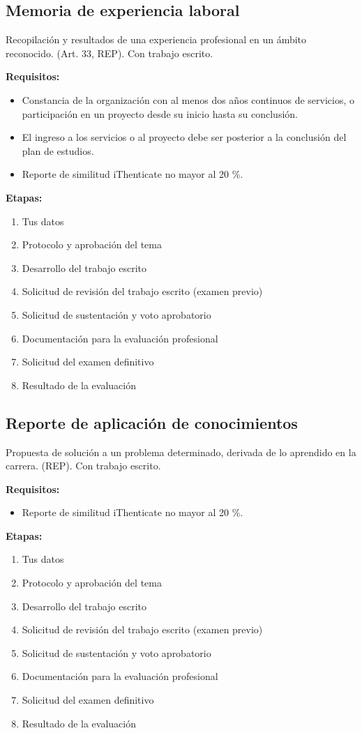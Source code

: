\subsection{Memoria de experiencia laboral}
Recopilación y resultados de una experiencia profesional en un ámbito reconocido. (Art. 33, REP). Con trabajo escrito.

\textbf{Requisitos:}
\begin{itemize}
  \item Constancia de la organización con al menos dos años continuos de servicios, o participación en un proyecto desde su inicio hasta su conclusión.
  \item El ingreso a los servicios o al proyecto debe ser posterior a la conclusión del plan de estudios.
  \item Reporte de similitud iThenticate no mayor al 20 \%.
\end{itemize}
\textbf{Etapas:}
\begin{enumerate}
  \item Tus datos
  \item Protocolo y aprobación del tema
  \item Desarrollo del trabajo escrito
  \item Solicitud de revisión del trabajo escrito (examen previo)
  \item Solicitud de sustentación y voto aprobatorio
  \item Documentación para la evaluación profesional
  \item Solicitud del examen definitivo
  \item Resultado de la evaluación
\end{enumerate}
\subsection{Reporte de aplicación de conocimientos}
Propuesta de solución a un problema determinado, derivada de lo aprendido en la carrera. (REP). Con trabajo escrito.

\textbf{Requisitos:}
\begin{itemize}
  \item Reporte de similitud iThenticate no mayor al 20 \%.
\end{itemize}
\textbf{Etapas:}
\begin{enumerate}
  \item Tus datos
  \item Protocolo y aprobación del tema
  \item Desarrollo del trabajo escrito
  \item Solicitud de revisión del trabajo escrito (examen previo)
  \item Solicitud de sustentación y voto aprobatorio
  \item Documentación para la evaluación profesional
  \item Solicitud del examen definitivo
  \item Resultado de la evaluación
\end{enumerate}
